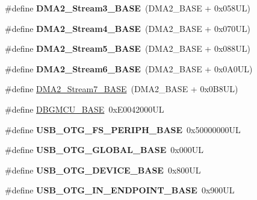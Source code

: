 \begin{DoxyCompactItemize}
\#define {\bfseries D\+M\+A2\+\_\+\+Stream3\+\_\+\+B\+A\+SE}~(D\+M\+A2\+\_\+\+B\+A\+SE + 0x058\+U\+L)
\item 
\mbox{\label{group___peripheral__memory__map_gad1e67740e6301233473f64638145dd1f}} 
\#define {\bfseries D\+M\+A2\+\_\+\+Stream4\+\_\+\+B\+A\+SE}~(D\+M\+A2\+\_\+\+B\+A\+SE + 0x070\+U\+L)
\item 
\mbox{\label{group___peripheral__memory__map_gaed1460fdc407b6decfbffccb0260d0af}} 
\#define {\bfseries D\+M\+A2\+\_\+\+Stream5\+\_\+\+B\+A\+SE}~(D\+M\+A2\+\_\+\+B\+A\+SE + 0x088\+U\+L)
\item 
\mbox{\label{group___peripheral__memory__map_ga5e81174c96fd204fa7c82c815e85c8e6}} 
\#define {\bfseries D\+M\+A2\+\_\+\+Stream6\+\_\+\+B\+A\+SE}~(D\+M\+A2\+\_\+\+B\+A\+SE + 0x0\+A0\+U\+L)
\item 
\#define \hyperlink{group___peripheral__memory__map_gaa9faa708ad2440d24eb1064cba9bb06d}{D\+M\+A2\+\_\+\+Stream7\+\_\+\+B\+A\+SE}~(D\+M\+A2\+\_\+\+B\+A\+SE + 0x0\+B8\+U\+L)
\item 
\#define \hyperlink{group___peripheral__memory__map_ga4adaf4fd82ccc3a538f1f27a70cdbbef}{D\+B\+G\+M\+C\+U\+\_\+\+B\+A\+SE}~0x\+E0042000\+UL
\item 
\mbox{\label{group___peripheral__memory__map_gaa86d4c80849a74938924e73937b904e7}} 
\#define {\bfseries U\+S\+B\+\_\+\+O\+T\+G\+\_\+\+F\+S\+\_\+\+P\+E\+R\+I\+P\+H\+\_\+\+B\+A\+SE}~0x50000000\+UL
\item 
\mbox{\label{group___peripheral__memory__map_ga044aa4388e72d9d47a03f387fb8926fb}} 
\#define {\bfseries U\+S\+B\+\_\+\+O\+T\+G\+\_\+\+G\+L\+O\+B\+A\+L\+\_\+\+B\+A\+SE}~0x000\+UL
\item 
\mbox{\label{group___peripheral__memory__map_ga4d74a337597a77b1fca978202b519a18}} 
\#define {\bfseries U\+S\+B\+\_\+\+O\+T\+G\+\_\+\+D\+E\+V\+I\+C\+E\+\_\+\+B\+A\+SE}~0x800\+UL
\item 
\mbox{\label{group___peripheral__memory__map_gad8f69041452615aeb3948600e3882246}} 
\#define {\bfseries U\+S\+B\+\_\+\+O\+T\+G\+\_\+\+I\+N\+\_\+\+E\+N\+D\+P\+O\+I\+N\+T\+\_\+\+B\+A\+SE}~0x900\+UL

\end{DoxyCompactItemize}

